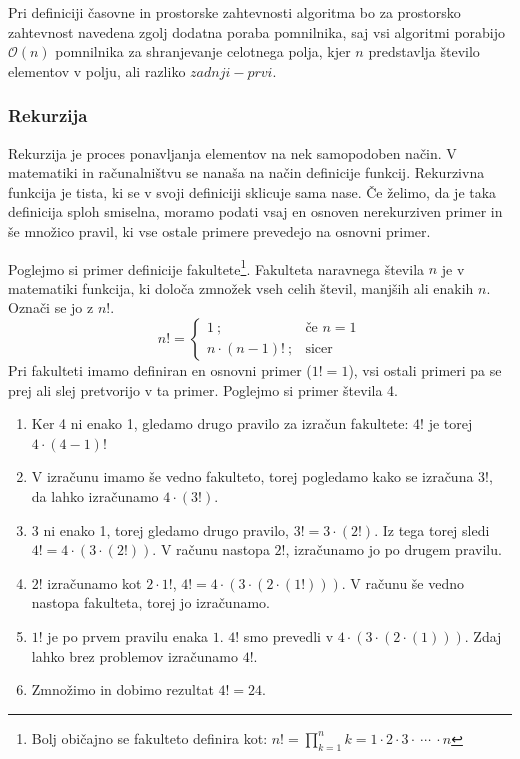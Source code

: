 \documentclass[a4paper,oneside,12pt]{article}
\begin{document}
Pri definiciji časovne in prostorske zahtevnosti algoritma bo za prostorsko zahtevnost 
navedena zgolj dodatna poraba pomnilnika, saj vsi algoritmi porabijo $\mathcal{O}(n)$ pomnilnika za
shranjevanje celotnega polja, kjer $n$ predstavlja število elementov v polju, ali razliko
$zadnji - prvi$.

\subsubsection{Rekurzija}
\label{chapter:rekurzija}
Rekurzija je proces ponavljanja elementov na nek samopodoben način. V matematiki in 
računalništvu se nanaša na način definicije funkcij. Rekurzivna funkcija je tista, 
ki se v svoji definiciji sklicuje sama nase. Če želimo, da je taka definicija sploh 
smiselna, moramo podati vsaj en osnoven nerekurziven primer in še množico pravil, 
ki vse ostale primere prevedejo na osnovni primer.

Poglejmo si primer definicije fakultete\footnote{Bolj običajno se fakulteto definira kot:
$n! = \displaystyle\prod_{k=1}^{n} k = 1 \cdot 2 \cdot 3 \cdot \ \cdots\  \cdot n$}. Fakulteta naravnega števila $n$ je v matematiki
funkcija, ki določa zmnožek vseh celih števil, manjših ali enakih $n$. Označi se jo z $n!$.
\[
n! = \left\{ 
\begin{array}{rl}
     1             \ ;& \mbox{če $n = 1$} \\
     n \cdot (n-1)!\ ;& \mbox{sicer}
\end{array} \right.
\]
Pri fakulteti imamo definiran en osnovni primer ($1! = 1$), vsi ostali primeri pa se prej
ali slej pretvorijo v ta primer. Poglejmo si primer števila 4.
\begin{enumerate}
  \item Ker 4 ni enako 1, gledamo drugo pravilo za izračun fakultete: $4!$ je torej $4
    \cdot \left(4 - 1\right)!$
  \item V izračunu imamo še vedno fakulteto, torej pogledamo kako se izračuna $3!$, da
    lahko izračunamo $4 \cdot \left(3!\right)$.
  \item 3 ni enako 1, torej gledamo drugo pravilo, $3! = 3 \cdot (2!)$. Iz tega
    torej sledi \mbox{$4! =
    4 \cdot \left(3 \cdot \left(2!\right)\right)$}. V računu nastopa $2!$, izračunamo jo po drugem pravilu.
  \item $2!$ izračunamo kot $2 \cdot 1!$, $4! = 4 \cdot \left(3 \cdot \left(2 \cdot \left(1!\right)\right)\right)$. V računu še
    vedno nastopa fakulteta, torej jo izračunamo.
  \item $1!$ je po prvem pravilu enaka $1$. $4!$ smo prevedli v $4 \cdot \left(3 \cdot \left(2 \cdot
    \left(1\right)\right)\right)$. Zdaj lahko brez problemov izračunamo $4!$.
  \item Zmnožimo in dobimo rezultat $4! = 24$.
\end{enumerate}
\end{document}
